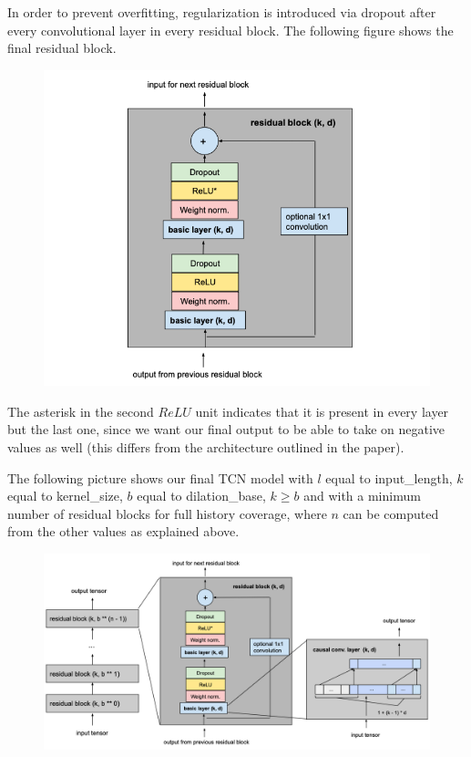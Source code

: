 In order to prevent overfitting, regularization is introduced via dropout after every convolutional layer in every residual block. The following figure shows the final residual block.
\begin{figure}[h]
    \includegraphics[width=\textwidth]{../Figures/ch3_4.png}
\end{figure}
The asterisk in the second $ReLU$ unit indicates that it is present in every layer but the last one, since we want our final output to be able to take on negative values as well (this differs from the architecture outlined in the paper).

The following picture shows our final TCN model with $l$ equal to input\_length, $k$ equal to kernel\_size, $b$ equal to dilation\_base, $k\geq b$ and with a minimum number of residual blocks for full history coverage, where $n$ can be computed from the other values as explained above.
\begin{figure}[h]
    \includegraphics[width=\textwidth]{../Figures/ch3_5.png}
\end{figure}


